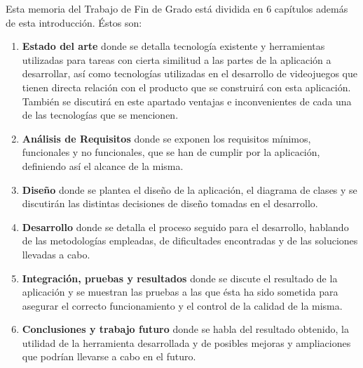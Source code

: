 Esta memoria del Trabajo de Fin de Grado está dividida en 6 capítulos además de esta introducción. Éstos son:

\begin{enumerate}
	\item \textbf{Estado del arte} donde se detalla tecnología existente y herramientas utilizadas para tareas con cierta similitud a las partes de la aplicación a desarrollar, así como tecnologías utilizadas en el desarrollo de videojuegos que tienen directa relación con el producto que se construirá con esta aplicación. También se discutirá en este apartado ventajas e inconvenientes de cada una de las tecnologías que se mencionen.
	\item \textbf{Análisis de Requisitos} donde se exponen los requisitos mínimos, funcionales y no funcionales, que se han de cumplir por la aplicación, definiendo así el alcance de la misma.
	\item \textbf{Diseño} donde se plantea el diseño de la aplicación, el diagrama de clases y se discutirán las distintas decisiones de diseño tomadas en el desarrollo.
	\item \textbf{Desarrollo} donde se detalla el proceso seguido para el desarrollo, hablando de las metodologías empleadas, de dificultades encontradas y de las soluciones llevadas a cabo.
	\item \textbf{Integración, pruebas y resultados} donde se discute el resultado de la aplicación y se muestran las pruebas a las que ésta ha sido sometida para asegurar el correcto funcionamiento y el control de la calidad de la misma.
	\item \textbf{Conclusiones y trabajo futuro} donde se habla del resultado obtenido, la utilidad de la herramienta desarrollada y de posibles mejoras y ampliaciones que podrían llevarse a cabo en el futuro.
\end{enumerate}
